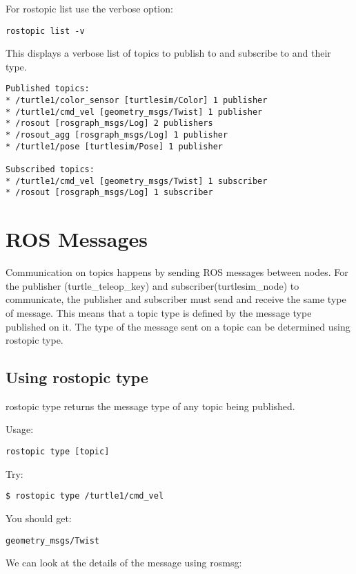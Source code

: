 For rostopic list use the verbose option:
\begin{lstlisting}[breaklines=true languages=bash]
rostopic list -v
\end{lstlisting}

This displays a verbose list of topics to publish to and subscribe to and their type.

\begin{lstlisting}[breaklines=true languages=bash]
Published topics:
* /turtle1/color_sensor [turtlesim/Color] 1 publisher
* /turtle1/cmd_vel [geometry_msgs/Twist] 1 publisher
* /rosout [rosgraph_msgs/Log] 2 publishers
* /rosout_agg [rosgraph_msgs/Log] 1 publisher
* /turtle1/pose [turtlesim/Pose] 1 publisher

Subscribed topics:
* /turtle1/cmd_vel [geometry_msgs/Twist] 1 subscriber
* /rosout [rosgraph_msgs/Log] 1 subscriber
\end{lstlisting}

\section{ROS Messages}
Communication on topics happens by sending ROS messages between nodes. For the publisher (turtle\_teleop\_key) and subscriber(turtlesim\_node) to communicate, the publisher and subscriber must send and receive the same type of message. This means that a topic type is defined by the message type published on it. The type of the message sent on a topic can be determined using rostopic type.

\subsection{Using rostopic type}
rostopic type returns the message type of any topic being published.

Usage:
\begin{lstlisting}[breaklines=true language=bash]
rostopic type [topic]
\end{lstlisting}

Try:
\begin{lstlisting}[breaklines=true languages=bash]
$ rostopic type /turtle1/cmd_vel
\end{lstlisting}

You should get:
\begin{lstlisting}[breaklines=true language=bash]
geometry_msgs/Twist
\end{lstlisting}

We can look at the details of the message using rosmsg:


